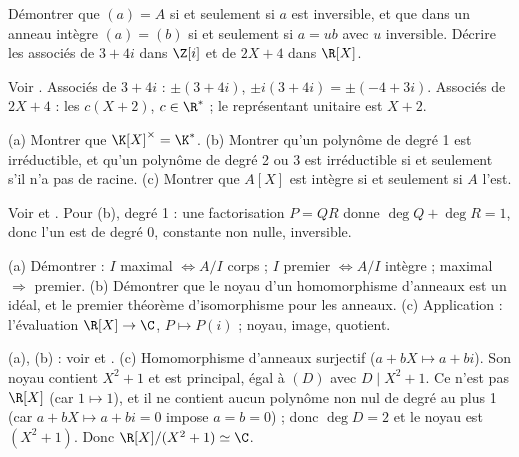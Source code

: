 \begin{exo}
Démontrer que $(a)=A$ si et seulement si $a$ est inversible, et que dans un anneau intègre $(a)=(b)$ si et seulement si $a=ub$ avec $u$ inversible. Décrire les associés de $3+4i$ dans $\Z[i]$ et de $2X+4$ dans $\R[X]$.
\begin{corrige}
Voir . Associés de $3+4i$ : $\pm(3+4i)$, $\pm i(3+4i)=\pm(-4+3i)$. Associés de $2X+4$ : les $c(X+2)$, $c\in\R^*$ ; le représentant unitaire est $X+2$.
\end{corrige}
\end{exo}
\begin{exo}[A][Polynômes]
(a) Montrer que $\K[X]^\times=\K^*$. (b) Montrer qu'un polynôme de degré 1 est irréductible, et qu'un polynôme de degré 2 ou 3 est irréductible si et seulement s'il n'a pas de racine. (c) Montrer que $A[X]$ est intègre si et seulement si $A$ l'est.
\begin{corrige}
Voir  et . Pour (b), degré 1 : une factorisation $P=QR$ donne $\deg Q+\deg R=1$, donc l'un est de degré 0, constante non nulle, inversible.
\end{corrige}
\end{exo}
\begin{exo}
(a) Démontrer : $I$ maximal $\iff A/I$ corps ; $I$ premier $\iff A/I$ intègre ; maximal $\Rightarrow$ premier. (b) Démontrer que le noyau d'un homomorphisme d'anneaux est un idéal, et le premier théorème d'isomorphisme pour les anneaux. (c) Application : l'évaluation $\R[X]\to\C$, $P\mapsto P(i)$ ; noyau, image, quotient.
\begin{corrige}
(a), (b) : voir  et . (c) Homomorphisme d'anneaux surjectif ($a+bX\mapsto a+bi$). Son noyau contient $X^2+1$ et est principal, égal à $(D)$ avec $D\mid X^2+1$. Ce n'est pas $\R[X]$ (car $1\mapsto1$), et il ne contient aucun polynôme non nul de degré au plus 1 (car $a+bX\mapsto a+bi=0$ impose $a=b=0$) ; donc $\deg D=2$ et le noyau est $(X^2+1)$. Donc $\R[X]/(X^2+1)\simeq\C$.
\end{corrige}
\end{exo}


